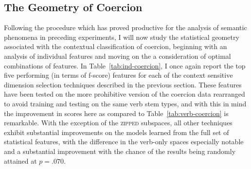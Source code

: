 \subsection{The Geometry of Coercion}
Following the procedure which has proved productive for the analysis of semantic phenomena in preceding experiments, I will now study the statistical geometry associated with the contextual classification of coercion, beginning with an analysis of individual features and moving on the a consideration of optimal combinations of features.  In Table~\ref{tab:ind-coercion}, I once again report the top five performing (in terms of f-score) features for each of the context sensitive dimension selection techniques described in the previous section.  These features have been tested on the more prohibitive version of the coercion data rearranged to avoid training and testing on the same verb stem types, and with this in mind the improvement in scores here as compared to Table~\ref{tab:verb-coercion} is remarkable.  With the exception of the \textsc{zipped} subspaces, all other techniques exhibit substantial improvements on the models learned from the full set of statistical features, with the difference in the verb-only spaces especially notable and a substantial improvement with the chance of the results being randomly attained at $p = .070$.

